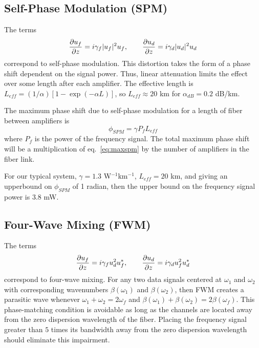 \subsection{Self-Phase Modulation (SPM)}

The terms
\begin{equation*}
\frac{\partial u_f}{\partial z} = i\gamma_f|u_f|^2u_f, \qquad
\frac{\partial u_d}{\partial z} = i\gamma_d|u_d|^2u_d
\end{equation*}
correspond to self-phase modulation. This distortion takes the form of a phase shift dependent on the signal power. Thus, linear attenuation limits the effect over some length after each amplifier. The effective length is $L_{eff} = (1/\alpha)[1-\exp(-\alpha L)]$, so $L_{eff} \approx 20$ km for $\alpha_{dB} = 0.2$ dB/km.

The maximum phase shift due to self-phase modulation for a length of fiber between amplifiers is \cite{Agrawal2013}
%
\begin{equation} \label{eq:maxspm}
\phi_{SPM} = \gamma P_f L_{eff}
\end{equation}
%
where $P_f$ is the power of the frequency signal. The total maximum phase shift will be a multiplication of eq.~\ref{eq:maxspm} by the number of amplifiers in the fiber link.

For our typical system, $\gamma = 1.3$ W$^{-1}$km$^{-1}$, $L_{eff} = 20$ km, and giving an upperbound on $\phi_{SPM}$ of 1 radian, then the upper bound on the frequency signal power is $3.8$ mW.

\subsection{Four-Wave Mixing (FWM)}

The terms
\begin{equation*}
\frac{\partial u_f}{\partial z} = i\gamma_f u_d^2u_f^*, \qquad \frac{\partial u_d}{\partial z} = i\gamma_d u_f^2u_d^*
\end{equation*}
correspond to four-wave mixing. For any two data signals centered at $\omega_1$ and $\omega_2$ with corresponding wavenumbers $\beta(\omega_1)$ and $\beta(\omega_2)$, then FWM creates a parasitic wave whenever $\omega_1 + \omega_2 = 2\omega_f$ and $\beta(\omega_1) + \beta(\omega_2) = 2\beta(\omega_f)$. This phase-matching condition is avoidable as long as the channels are located away from the zero dispersion wavelength of the fiber. Placing the frequency signal greater than $5$ times its bandwidth away from the zero dispersion wavelength should eliminate this impairment.

